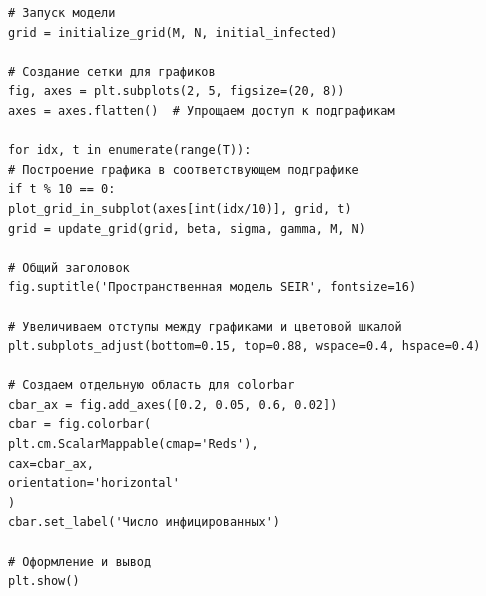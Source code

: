 \documentclass[a4paper, 14pt]{extreport}
\numberwithin{equation}{section}
\begin{document}
\begin{verbatim}
# Запуск модели
grid = initialize_grid(M, N, initial_infected)

# Создание сетки для графиков
fig, axes = plt.subplots(2, 5, figsize=(20, 8)) 
axes = axes.flatten()  # Упрощаем доступ к подграфикам

for idx, t in enumerate(range(T)):
# Построение графика в соответствующем подграфике
if t % 10 == 0: 
plot_grid_in_subplot(axes[int(idx/10)], grid, t)
grid = update_grid(grid, beta, sigma, gamma, M, N)

# Общий заголовок
fig.suptitle('Пространственная модель SEIR', fontsize=16)

# Увеличиваем отступы между графиками и цветовой шкалой
plt.subplots_adjust(bottom=0.15, top=0.88, wspace=0.4, hspace=0.4)

# Создаем отдельную область для colorbar
cbar_ax = fig.add_axes([0.2, 0.05, 0.6, 0.02])
cbar = fig.colorbar(
plt.cm.ScalarMappable(cmap='Reds'),
cax=cbar_ax,
orientation='horizontal'
)
cbar.set_label('Число инфицированных')

# Оформление и вывод
plt.show()
\end{verbatim}
\end{document}
